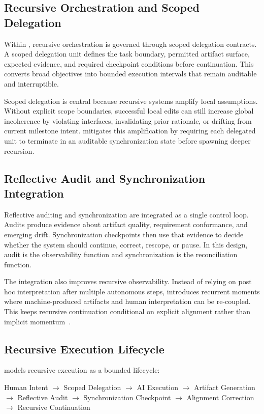 \subsection{Recursive Orchestration and Scoped Delegation}

Within , recursive orchestration is governed through scoped delegation contracts. A scoped delegation unit defines the task boundary, permitted artifact surface, expected evidence, and required checkpoint conditions before continuation. This converts broad objectives into bounded execution intervals that remain auditable and interruptible.

Scoped delegation is central because recursive systems amplify local assumptions. Without explicit scope boundaries, successful local edits can still increase global incoherence by violating interfaces, invalidating prior rationale, or drifting from current milestone intent.  mitigates this amplification by requiring each delegated unit to terminate in an auditable synchronization state before spawning deeper recursion.

\subsection{Reflective Audit and Synchronization Integration}

Reflective auditing and synchronization are integrated as a single control loop. Audits produce evidence about artifact quality, requirement conformance, and emerging drift. Synchronization checkpoints then use that evidence to decide whether the system should continue, correct, rescope, or pause. In this design, audit is the observability function and synchronization is the reconciliation function.

The integration also improves recursive observability. Instead of relying on post hoc interpretation after multiple autonomous steps,  introduces recurrent moments where machine-produced artifacts and human interpretation can be re-coupled. This keeps recursive continuation conditional on explicit alignment rather than implicit momentum~\cite{Chandy1985DistributedSnapshots,Lamport1978TimeClocks}.

\subsection{Recursive Execution Lifecycle}

 models recursive execution as a bounded lifecycle:
\begin{center}
Human Intent $\rightarrow$ Scoped Delegation $\rightarrow$ AI Execution $\rightarrow$ Artifact Generation $\rightarrow$ Reflective Audit $\rightarrow$ Synchronization Checkpoint $\rightarrow$ Alignment Correction $\rightarrow$ Recursive Continuation
\end{center}

